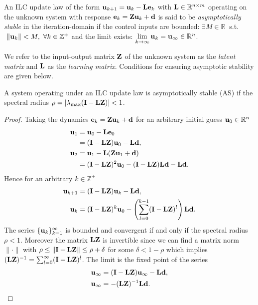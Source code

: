 \begin{defn} An ILC update law of the form $\sysInput_{k+1} = \sysInput_{k} - \lmatrix \error_{k}$ with $\lmatrix \in \mathbb{R}^{n \times m}$ operating on the unknown system with response $\error_k = \latentMat \sysInput_k + \linDist$ is said to be \emph{asymptotically stable} in the iteration-domain if the control inputs are bounded: $\exists M \in \mathbb{R} \ $ s.t. $\ \|\sysInput_k\| < M, \ \forall k \in \mathbb{Z}^{+}$ and the limit exists: $\lim\limits_{k \to \infty}\sysInput_k = \sysInput_{\infty} \in \mathbb{R}^{n}$. \end{defn}
%
We refer to the input-output matrix $\latentMat$ of the unknown system as the \emph{latent matrix} and $\lmatrix$ as the \emph{learning matrix}. Conditions for ensuring asymptotic stability are given below.
%
\begin{lem}[AS] \label{AS} A system operating under an ILC update law is asymptotically stable (AS) if the spectral radius $\rho = |\lambda_{\mathrm{max}}(\vec{I} - \lmatrix\latentMat)| < 1$. \end{lem}
%
\begin{proof}
Taking the dynamics $\error_k = \latentMat \sysInput_k + \linDist$ for an arbitrary initial guess $\sysInput_0 \in \mathbb{R}^{n}$
\begin{align}
\sysInput_1 &= \sysInput_0 - \lmatrix\error_0 \\
            &= (\vec{I} - \lmatrix\latentMat)\sysInput_0 - \lmatrix\linDist, \\
\sysInput_2 &= \sysInput_1 - \lmatrix(\latentMat\sysInput_1 + \linDist) \\ 
&= (\vec{I} - \lmatrix\latentMat)^{2}\sysInput_0 - (\vec{I} - \lmatrix\latentMat)\lmatrix\linDist - \lmatrix\linDist.
\end{align}
%
\noindent Hence for an arbitrary $k \in \mathbb{Z}^{+}$
%
\begin{align}
\sysInput_{k+1} &= (\vec{I} - \lmatrix\latentMat)\sysInput_{k} - \lmatrix\linDist, \\
\sysInput_k &= (\vec{I} - \lmatrix\latentMat)^{k}\sysInput_0 - \left(\sum_{l=0}^{k-1}(\vec{I} - \lmatrix\latentMat)^{l}\right)\lmatrix\linDist.
\end{align}
%
\noindent The series $\{\sysInput_{k}\}_{k=1}^{\infty}$ is bounded and convergent if and only if the spectral radius $\rho < 1$. Moreover the matrix $\lmatrix\latentMat$ is invertible since we can find a matrix norm $\|\cdot\|$ with $\rho \leq \|\vec{I} - \lmatrix\latentMat\| \leq \rho + \delta$ for some $\delta < 1 - \rho$ which implies $(\lmatrix\latentMat)^{-1} = \sum_{l=0}^{\infty}(\vec{I} - \lmatrix\latentMat)^{l}$. The limit is the fixed point of the series
%
\begin{align}
\sysInput_{\infty} &= (\vec{I} - \lmatrix\latentMat)\sysInput_{\infty} - \lmatrix\linDist, \\
\sysInput_{\infty} &= -(\lmatrix\latentMat)^{-1}\lmatrix\linDist.
\end{align}
%
\end{proof}
